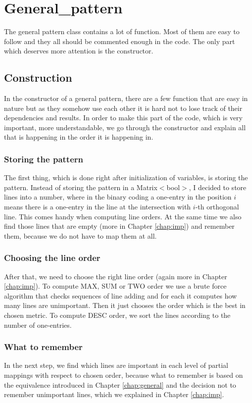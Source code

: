 \section{General\_pattern}
The general pattern class contains a lot of function. Most of them are easy to follow and they all should be commented enough in the code. The only part which deserves more attention is the constructor.

\subsection{Construction}
In the constructor of a general pattern, there are a few function that are easy in nature but as they somehow use each other it is hard not to lose track of their dependencies and results. In order to make this part of the code, which is very important, more understandable, we go through the constructor and explain all that is happening in the order it is happening in.

\subsubsection{Storing the pattern}
The first thing, which is done right after initialization of variables, is storing the pattern. Instead of storing the pattern in a Matrix$<$bool$>$, I decided to store lines into a number, where in the binary coding a one-entry in the position $i$ means there is a one-entry in the line at the intersection with $i$-th orthogonal line. This comes handy when computing line orders. At the same time we also find those lines that are empty (more in Chapter \ref{chap:imp}) and remember them, because we do not have to map them at all.

\subsubsection{Choosing the line order}
After that, we need to choose the right line order (again more in Chapter \ref{chap:imp}). To compute MAX, SUM or TWO order we use a brute force algorithm that checks sequences of line adding and for each it computes how many lines are unimportant. Then it just chooses the order which is the best in chosen metric. To compute DESC order, we sort the lines according to the number of one-entries.

\subsubsection{What to remember}
In the next step, we find which lines are important in each level of partial mappings with respect to chosen order, because what to remember is based on the equivalence introduced in Chapter \ref{chap:general} and the decision not to remember unimportant lines, which we explained in Chapter \ref{chap:imp}.

